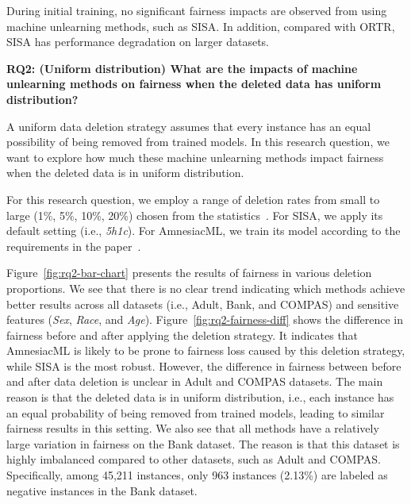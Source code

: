 \begin{tcolorbox}During initial training, no significant fairness impacts are observed from using machine unlearning methods, such as SISA. In addition, compared with ORTR, SISA has performance degradation on larger datasets.
\end{tcolorbox}



\begin{flushleft}
\textbf{RQ2: (Uniform distribution) What are the impacts of machine unlearning methods on fairness when the deleted data has uniform distribution?}
\end{flushleft}




A uniform data deletion strategy assumes that every instance has an equal possibility of being removed from trained models. In this research question, we want to explore how much these machine unlearning methods impact fairness when the deleted data is in uniform distribution.

For this research question, we employ a range of deletion rates from small to large (1\%, 5\%, 10\%, 20\%) chosen from the statistics~\cite{rtbf5years}. 
For SISA, we apply its default setting (i.e., \textit{5h1c}).
For AmnesiacML, we train its model according to the requirements in the paper~\cite{amnesiac}.



Figure~\ref{fig:rq2-bar-chart} presents the results of fairness in various deletion proportions. We see that there is no clear trend indicating which methods achieve better results across all datasets (i.e., Adult, Bank, and COMPAS) and sensitive features (\textit{Sex}, \textit{Race}, and \textit{Age}). Figure~\ref{fig:rq2-fairness-diff} shows the difference in fairness before and after applying the deletion strategy. It indicates that AmnesiacML is likely to be prone to fairness loss caused by this deletion strategy, while SISA is the most robust. However, the difference in fairness between before and after data deletion is unclear in Adult and COMPAS datasets. The main reason is that the deleted data is in uniform distribution, i.e., each instance has an equal probability of being removed from trained models, leading to similar fairness results in this setting. We also see that all methods have a relatively large variation in fairness on the Bank dataset. The reason is that this dataset is highly imbalanced compared to other datasets, such as Adult and COMPAS. Specifically, among 45,211 instances, only 963 instances (2.13\%) are labeled as negative instances in the Bank dataset.


